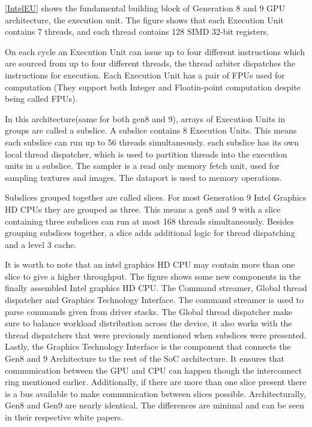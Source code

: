 
\ref{IntelEU} shows the fundamental building block of Generation 8 and 9 \gls{GPU} architecture, the execution unit. 
The figure shows that each Execution Unit contains 7 threads, and each thread contains 128 SIMD 32-bit registers.  

On each cycle an Execution Unit can issue up to four different instructions which are sourced from up to four different threads, the thread arbiter dispatches the instructions for execution.
Each Execution Unit has a pair of FPUs used for computation (They support both Integer and Floatin-point computation despite being called FPUs).

In this architecture(same for both gen8 and 9), arrays of Execution Units in groups are called a subslice. A subslice contains 8 Execution Units. 
This means each subslice can run up to 56 threads simultaneously. 
each subslice has its own local thread dispatcher, which is used to partition threads into the execution units in a subslice.
The sampler is a read only memory fetch unit, used for sampling textures and images.
The dataport is used to memory operations.

Subslices grouped together are called slices. For most Generation 9 Intel Graphics HD \glspl{CPU} they are grouped as three.
This means a gen8 and 9 with a slice containing three subslices can run at most 168 threads simultaneously.
Besides grouping subslices together, a slice adds additional logic for thread dispatching and a level 3 cache.

It is worth to note that an intel graphics HD \gls{CPU} may contain more than one slice to give a higher throughput.
The figure shows some new components in the finally assembled Intel graphics HD \gls{CPU}. The Command streamer, Global thread dispatcher and Graphics Technology Interface.
The command streamer is used to parse commands given from driver stacks. 
The Global thread dispatcher make sure to balance workload distribution across the device, it also works with the thread dispatchers that were previously mentioned when subslices were presented.
Lastly, the Graphics Technology Interface is the component that connects the Gen8 and 9 Architecture to the rest of the SoC architecture. 
It ensures that communication between the \gls{GPU} and \gls{CPU} can happen though the interconnect ring mentioned earlier.  
Additionally, if there are more than one slice present there is a bus available to make communication between slices possible. 
Architecturally, Gen8 \cite{computegen8} and Gen9 \cite{computegen9} are nearly identical. The differences are minimal and can be seen in their respective white papers. 

